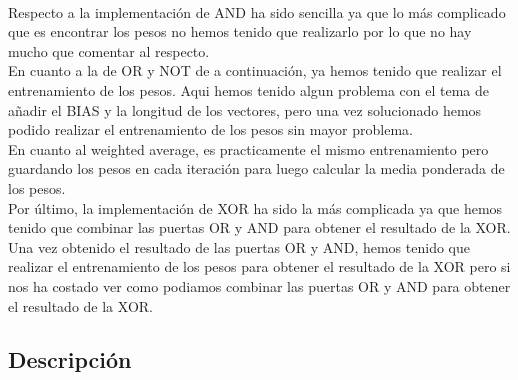 \documentclass{report}
\begin{document}
        \paragraph*{}{
          Respecto a la implementación de AND ha sido sencilla ya que lo más complicado que es encontrar los pesos no hemos tenido que realizarlo por lo que no hay mucho que comentar al respecto.\\
          
          En cuanto a la de OR y NOT de a continuación, ya hemos tenido que realizar el entrenamiento de los pesos. Aqui hemos tenido algun problema con el tema de añadir el BIAS y la longitud de los vectores, pero una vez solucionado hemos podido realizar el entrenamiento de los pesos sin mayor problema.\\

          En cuanto al weighted average, es practicamente el mismo entrenamiento pero guardando los pesos en cada iteración para luego calcular la media ponderada de los pesos.\\

          Por último, la implementación de XOR ha sido la más complicada ya que hemos tenido que combinar las puertas OR y AND para obtener el resultado de la XOR. Una vez obtenido el resultado de las puertas OR y AND, hemos tenido que realizar el entrenamiento de los pesos para obtener el resultado de la XOR pero si nos ha costado ver como podiamos combinar las puertas OR y AND para obtener el resultado de la XOR.\\
        }
      \subsection*{Descripción}
\end{document}
